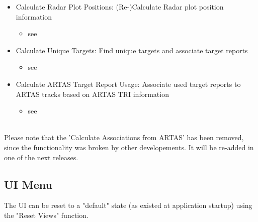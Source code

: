 \begin{itemize}
 \item Calculate Radar Plot Positions: (Re-)Calculate Radar plot position information
   \begin{itemize}
 \item see 
 \end{itemize}
 \item Calculate Unique Targets: Find unique targets and associate target reports
   \begin{itemize}
 \item see 
 \end{itemize}
 \item Calculate ARTAS Target Report Usage: Associate used target reports to ARTAS tracks based on ARTAS TRI information
   \begin{itemize}
   \item see 
   \end{itemize}
\end{itemize}
\  \\

Please note that the 'Calculate Associations from ARTAS' has been removed, since the functionality was broken by other developements. It will be re-added in one of the next releases.

\subsection{UI Menu}
\label{sec:ui_overview_ui_menu}

The UI can be reset to a "default" state (as existed at application startup) using the "Reset Views" function.















